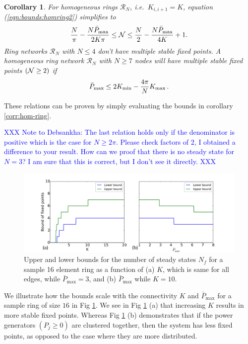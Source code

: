 \documentclass[10pt,aps,pre,preprint,superscriptaddress]{revtex4-1}
\newcommand{\dirk}[1]{\textcolor{blue}{#1}}
\newcommand{\N}{{\cal N}}
\newcommand{\R}{\mathcal{R}}
\newtheorem{corr}{Corollary}
\begin{document}
\begin{corr}
\label{cor:high-k-nf}
\label{corr:nomult-3}
For homogeneous rings $\R_N$, i.e.~$K_{i,i+1}=K$, equation (\ref{eqn:bounds:homring2})      
simplifies to
\begin{align}
   \frac{N}{\pi}-\frac{N\bar{P}_{\max}}{2K\pi} \leq \N \leq \frac{N}{2} - \frac{N\bar{P}_{\max}}{4K}+1.
\end{align} 
Ring networks $\R_N$ with $N \le 4$ don't have multiple stable fixed points.
A homogeneous ring network $\R_{N}$ with $N \ge 7$ nodes 
will have multiple stable fixed points $(\N \ge 2)$ if 
\begin{align}
   \label{crit:mult-fp}
   \bar{P}_{\max} \le 2 K_{\rm min} - \frac{4 \pi }{N} K_{\rm max} \, .
\end{align}
\end{corr}
These relations can be proven by simply evaluating the bounds in corollary  
\ref{corr:hom-ring}.

\dirk{XXX Note to Debsankha: The last relation holds only if the denominator is
positive which is the case for $N \ge 2\pi$. Please check factors of $2$, I obtained
a difference to your result. How can we proof that there is no steady state for $N=3$? I am 
sure that this is correct, but I don't see it directly. XXX}

\begin{figure}[htb]
\label{fig:scaling-nf}
\begin{center}
\includegraphics[width=\columnwidth]{pics/num_fps_k_p_ring}
\caption{
Upper and lower bounds for the number of steady states $N_f$ 
for a sample 16 element ring as a function of (a) $K$, which is same for all 
edges, while $\bar{P}_{\max}=3$, and (b) $\bar{P}_{\max}$ while $K=10$.  }
\end{center}
\end{figure}

We illustrate how the bounds scale with the connectivity $K$  and $\bar{P}_{\max}$ for a sample ring 
of size $16$ in  Fig \ref{fig:scaling-nf}. We see in Fig \ref{fig:scaling-nf} 
(a) that increasing $K$ results in more stable fixed points.  Whereas Fig 
\ref{fig:scaling-nf} (b)  demonstrates that if the power generators 
$(P_j\ge  0)$ are clustered together, then the system has less fixed points, 
as opposed to the case where they are more distributed.   
\end{document}
